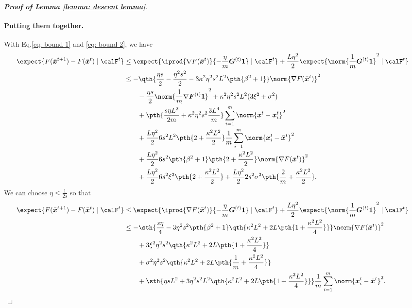 \documentclass[letterpaper, 10 pt, conference]{ieeeconf}  %
\newcommand{\x}{{\bm x}}
\begin{document}
\begin{proof}[\bf Proof of Lemma \ref{lemma: descent lemma}]
\paragraph{Putting them together.}
With Eq.\eqref{eq: bound 1} and \eqref{eq: bound 2}, we have 
\begin{align*}
\expect{F(\bar{\x}^{t+1})  -  F(\bar{\x}^{t}) \mid \calF^{t}}  
&\le \expect{\iprod{\nabla F(\bar{\x}^{t})}{- \frac{\eta}{m} \bm{G}^{(t)} \bm{1}} \mid \calF^{t}} +  \frac{L\eta^2}{2}\expect{\norm{\frac{1}{m} \bm{G}^{(t)} \bm{1}}^2 \mid \calF^{t}}\\
& \le - \qth{\frac{\eta s}{2} - \frac{\eta^2 s^2}{2} - 3\kappa^2 \eta^2 s^2 L^2\pth{\beta^2 + 1}} \norm{\nabla F(\bar{\x}^t)}^2\\
\nonumber
& \qquad - \frac{\eta s}{2} \norm{\frac{1}{m}\nabla \bm{F}^{(t)}\bm{1}}^2 + \kappa^2 \eta^2 s^2 L^2 (3\xi^2 +\sigma^2)\\
& \qquad + \pth{\frac{s\eta L^2 }{2m} + \kappa^2 \eta^2 s^2 \frac{3L^4}{m}} \sum_{i=1}^m \norm{\bar{\x}^{t} - \x_i^t}^2 \\
& \qquad + \frac{L\eta^2}{2}6s^2L^2\pth{2 +\frac{\kappa^2 L^2}{2}} \frac{1}{m} \sum_{i=1}^m \norm{\x_i^t - \bar{\x}^t}^2 \\
\nonumber
& \qquad +\frac{L\eta^2}{2}6 s^2\pth{\beta^2 + 1}\pth{2 +\frac{\kappa^2 L^2}{2}}\norm{\nabla F(\bar{\x}^t)}^2 \\
&\qquad + \frac{L\eta^2}{2}6 s^2\xi^2 \pth{2 +\frac{\kappa^2  L^2}{2}} + \frac{L\eta^2}{2} 2s^2\sigma^2\pth{\frac{2}{m} + \frac{\kappa^2 L^2}{2}}. 
\end{align*}
We can choose $\eta\le \frac{1}{2s}$ so that
\begin{align*}
\expect{F(\bar{\x}^{t+1})  -  F(\bar{\x}^{t}) \mid \calF^{t}}  
&\le \expect{\iprod{\nabla F(\bar{\x}^{t})}{- \frac{\eta}{m} \bm{G}^{(t)} \bm{1}} \mid \calF^{t}} +  \frac{L\eta^2}{2}\expect{\norm{\frac{1}{m} \bm{G}^{(t)} \bm{1}}^2 \mid \calF^{t}}\\
& \le - \sth{\frac{s\eta}{4} - 3 \eta^2 s^2 \pth{\beta^2 + 1}\qth{\kappa^2 L^2 + 2L \pth{1 + \frac{\kappa^2 L^2}{4}}}} \norm{\nabla F(\bar{\x}^t)}^2\\
\nonumber
& \qquad  +  3\xi^2 \eta^2 s^2 \qth{\kappa^2 L^2 + 2L \pth{1 + \frac{\kappa^2 L^2}{4}}} \\
& \qquad + \sigma^2 \eta^2 s^2 \qth{\kappa^2 L^2 + 2L \pth{\frac{1}{m} + \frac{\kappa^2 L^2}{4}}}\\
& \qquad +  \sth{\eta s L^2 + 3\eta^2 s^2 L^2\qth{\kappa^2 L^2 + 2L \pth{1 + \frac{\kappa^2 L^2}{4}}}} \frac{1}{m} \sum_{i=1}^m \norm{\x_i^t - \bar{\x}^t}^2.
\end{align*}
\end{proof}
\end{document}
